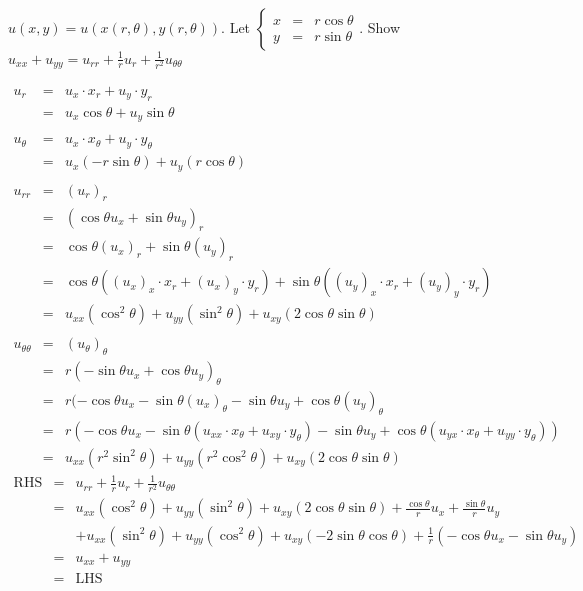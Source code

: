 \begin{eg} 
\(u(x, y) = u(x(r, \theta), y(r, \theta))\). Let \(\left\{\begin{array}{rcl}
x & = & r\cos \theta\\
y & = & r\sin \theta
\end{array}\right.\). Show \(\displaystyle u_{xx} + u_{yy} = u_{rr} + \frac{1}{r} u_r + \frac{1}{r^2} u_{\theta \theta}\)

\soln
\[\begin{array}{rcl}
u_r & = & u_x \cdot x_r + u_y \cdot y_r\\
& = & u_x \cos \theta + u_y \sin \theta\\\\
u_{\theta} & = & u_x \cdot x_{\theta} + u_y \cdot y_{\theta}\\
& = & u_x (-r\sin \theta) + u_y(r\cos \theta)\\\\
u_{rr} & = & (u_r)_r\\
& = & (\cos \theta u_x + \sin \theta u_y)_r\\
& = & \cos \theta (u_x)_r + \sin \theta (u_y)_r\\
& = & \cos \theta ((u_x)_x \cdot x_r + (u_x)_y \cdot y_r) + \sin \theta ((u_y)_x \cdot x_r + (u_y)_y \cdot y_r)\\
& = & u_{xx} (\cos^2 \theta) + u_{yy} (\sin^2 \theta) + u_{xy} (2\cos \theta \sin \theta)\\\\
u_{\theta \theta} & = & (u_\theta)_{\theta}\\
& = & r(-\sin \theta u_x + \cos \theta u_y)_{\theta}\\
& = & r(-\cos \theta u_x -\sin \theta(u_x)_{\theta} - \sin \theta u_y + \cos \theta (u_y)_{\theta}\\
& = & r(-\cos \theta u_x - \sin \theta (u_{xx} \cdot x_{\theta} + u_{xy} \cdot y_{\theta}) - \sin \theta u_y + \cos \theta (u_{yx} \cdot x_{\theta} + u_{yy} \cdot y_{\theta}))\\
& = & u_{xx} (r^2 \sin^2 \theta) +u_{yy} (r^2 \cos^2 \theta) + u_{xy} (2\cos \theta \sin \theta)
\end{array}\]
\[\begin{array}{rcl}
\text{RHS} & = & \displaystyle u_{rr} + \frac{1}{r} u_r + \frac{1}{r^2} u_{\theta \theta}\\
& = & \displaystyle u_{xx} (\cos^2 \theta) + u_{yy} (\sin^2 \theta) + u_{xy} (2\cos \theta \sin \theta) + \frac{\cos \theta}{r} u_x + \frac{\sin \theta}{r} u_y\\
&& \displaystyle + u_{xx} (\sin^2 \theta) + u_{yy} (\cos^2 \theta) + u_{xy} (-2\sin \theta \cos \theta) + \frac{1}{r} (-\cos \theta u_x - \sin \theta u_y)\\
& = & u_{xx} + u_{yy}\\
& = & \text{LHS}
\end{array}\]
\end{eg}